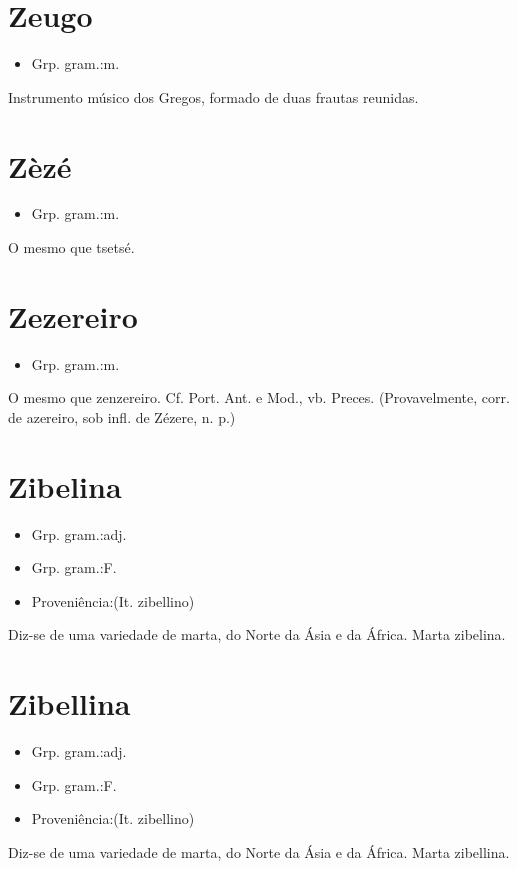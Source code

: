 \section{Zeugo}
\begin{itemize}
\item {Grp. gram.:m.}
\end{itemize}
Instrumento músico dos Gregos, formado de duas frautas reunidas.
\section{Zèzé}
\begin{itemize}
\item {Grp. gram.:m.}
\end{itemize}
O mesmo que \textunderscore tsetsé\textunderscore .
\section{Zezereiro}
\begin{itemize}
\item {Grp. gram.:m.}
\end{itemize}
O mesmo que \textunderscore zenzereiro\textunderscore . Cf. \textunderscore Port. Ant. e Mod.\textunderscore , vb. \textunderscore Preces\textunderscore .
(Provavelmente, corr. de \textunderscore azereiro\textunderscore , sob infl. de \textunderscore Zézere\textunderscore , n. p.)
\section{Zibelina}
\begin{itemize}
\item {Grp. gram.:adj.}
\end{itemize}
\begin{itemize}
\item {Grp. gram.:F.}
\end{itemize}
\begin{itemize}
\item {Proveniência:(It. \textunderscore zibellino\textunderscore )}
\end{itemize}
Diz-se de uma variedade de marta, do Norte da Ásia e da África.
Marta zibelina.
\section{Zibellina}
\begin{itemize}
\item {Grp. gram.:adj.}
\end{itemize}
\begin{itemize}
\item {Grp. gram.:F.}
\end{itemize}
\begin{itemize}
\item {Proveniência:(It. \textunderscore zibellino\textunderscore )}
\end{itemize}
Diz-se de uma variedade de marta, do Norte da Ásia e da África.
Marta zibellina.
